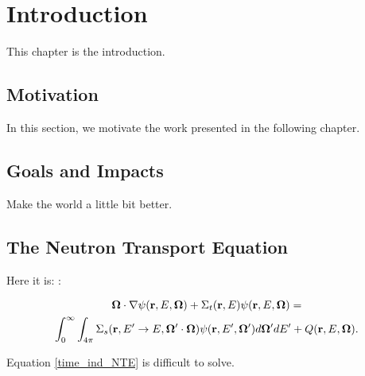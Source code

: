 \chapter{Introduction}

This chapter is the introduction.

\section{Motivation}

In this section, we motivate the work presented in the following chapter.

\section{Goals and Impacts}

Make the world a little bit better.

\section{The Neutron Transport Equation}

Here it is: \cite{dude}:

\begin{multline}
\mathbf\Omega \cdot \nabla \psi(\textbf{r},E,\mathbf\Omega) + \Sigma_t(\textbf{r},E) \psi(\textbf{r},E,\mathbf\Omega) =  \\
\int_0^\infty\int_{4\pi} \Sigma_s(\textbf{r},E'\rightarrow E,\mathbf\Omega'\cdot\mathbf\Omega)
\psi(\textbf{r},E',\mathbf\Omega')d\mathbf\Omega'dE' + Q(\textbf{r},E,\mathbf\Omega).
\label{time_ind_NTE}
\end{multline}

\noindent Equation \ref{time_ind_NTE} is difficult to solve.
